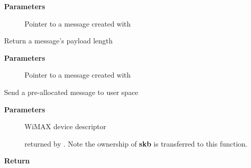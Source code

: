 \documentclass[a4paper,8pt,english]{sphinxmanual}
\begin{document}
\textbf{Parameters}
\begin{description}
\item[{}] \leavevmode
Pointer to a message created with {\hyperref[networking/kapi:c.wimax_msg_alloc]{\emph{}}}

\end{description}

\begin{fulllineitems}
\label{networking/kapi:c.wimax_msg_len}
Return a message's payload length

\end{fulllineitems}


\textbf{Parameters}
\begin{description}
\item[{}] \leavevmode
Pointer to a message created with {\hyperref[networking/kapi:c.wimax_msg_alloc]{\emph{}}}

\end{description}

\begin{fulllineitems}
\label{networking/kapi:c.wimax_msg_send}
Send a pre-allocated message to user space

\end{fulllineitems}


\textbf{Parameters}
\begin{description}
\item[{}] \leavevmode
WiMAX device descriptor

\item[{}] \leavevmode
{\hyperref[networking/kapi:c.sk_buff]{\emph{}}} returned by {\hyperref[networking/kapi:c.wimax_msg_alloc]{\emph{}}}. Note the
ownership of \textbf{skb} is transferred to this function.

\end{description}

\textbf{Return}
\end{document}
